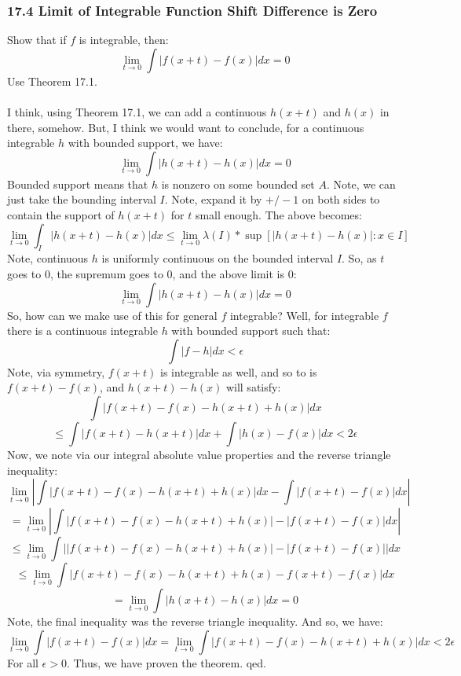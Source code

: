 \documentclass[12pt,a4paper]{article}
\newcommand{\1}[1]{\mathbbm{1}\left\{ #1 \right\}}
\begin{document}
\subsubsection{17.4 Limit of Integrable Function Shift Difference is Zero} Show that if $f$ is integrable, then:
$$
	\lim_{t \to 0} \int\left|f(x + t) - f(x)\right| dx = 0
$$
Use Theorem 17.1.
\\\\
I think, using Theorem 17.1, we can add a continuous $h(x+t)$ and $h(x)$ in there, somehow. But, I think we would want to conclude, for a continuous integrable $h$ with bounded support, we have:
$$
	\lim_{t \to 0} \int\left|h(x + t) - h(x)\right| dx = 0
$$
Bounded support means that $h$ is nonzero on some bounded set $A$. Note, we can just take the bounding interval $I$. Note, expand it by $+/-1$ on both sides to contain the support of $h(x+t)$ for $t$ small enough. The above becomes:
$$
	\lim_{t \to 0} \int_I\left|h(x + t) - h(x)\right| dx \leq
	\lim_{t \to 0} \lambda(I) * \sup\left[|h(x + t) - h(x)|: x \in I\right]
$$
Note, continuous $h$ is uniformly continuous on the bounded interval $I$. So, as $t$ goes to 0, the supremum goes to 0, and the above limit is 0:
$$
	\lim_{t \to 0} \int\left|h(x + t) - h(x)\right| dx = 0
$$
So, how can we make use of this for general $f$ integrable? Well, for integrable $f$ there is a continuous integrable $h$ with bounded support such that:
$$
	\int |f - h| dx < \epsilon
$$
Note, via symmetry, $f(x + t)$ is integrable as well, and so to is $f(x + t) - f(x)$, and $h(x + t) - h(x)$ will satisfy:
$$
	\int\left|f(x + t) - f(x) - h(x + t) + h(x)\right| dx
$$
$$
	\leq
	\int\left|f(x + t) - h(x + t)\right|dx + \int\left|h(x) - f(x)\right|dx < 2\epsilon
$$
Now, we note via our integral absolute value properties and the reverse triangle inequality:
$$
	\lim_{t \to 0} \left|\int\left|f(x + t) - f(x) - h(x + t) + h(x)\right| dx -
	\int\left|f(x + t) - f(x)\right|dx\right|
$$
$$
	=
	\lim_{t \to 0} \left|\int\left|f(x + t) - f(x) - h(x + t) + h(x)\right| - \left|f(x + t) - f(x)\right|dx\right|
$$
$$
	\leq
	\lim_{t \to 0} \int\left|\left|f(x + t) - f(x) - h(x + t) + h(x)\right| - \left|f(x + t) - f(x)\right|\right|dx
$$
$$
	\leq
	\lim_{t \to 0} \int\left|f(x + t) - f(x) - h(x + t) + h(x) - f(x + t) - f(x)\right|dx
$$
$$
	= \lim_{t \to 0} \int\left|h(x + t) - h(x)\right| dx = 0
$$
Note, the final inequality was the reverse triangle inequality. And so, we have:
$$
	\lim_{t \to 0} \int\left|f(x + t) - f(x)\right| dx = 
	\lim_{t \to 0} \int\left|f(x + t) - f(x) - h(x + t) + h(x)\right| dx < 2\epsilon
$$
For all $\epsilon > 0$. Thus, we have proven the theorem. qed.
\end{document}
